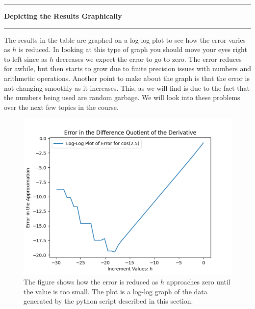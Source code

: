 \documentclass[10pt,fleqn]{article}
\begin{document}
\vskip0.1in\hrule\vskip0.1in \noindent
{\bf Depicting the Results Graphically}
\vskip0.1in\hrule\vskip0.1in \noindent
The results in the table are graphed on a log-log plot to see how the error
varies as \(h\) is reduced. In looking at this type of graph you should move
your eyes right to left since as \(h\) decreases we expect the error to go to
zero. The error reduces for awhile, but then starts to grow due to finite
precision issues with numbers and arithmetic operations. Another point to make
about the graph is that the error is not changing smoothly as it increases.
This, as we will find is due to the fact that the numbers being used are random
garbage. We will look into these problems over the next few topics in the
course.
\vfill
\begin{figure}[h]
\centering
\includegraphics{../images/diff_quotient_01.png}
\vskip0.1in
\caption{The figure shows how the error is reduced as \(h\) approaches zero
until the value is too small. The plot is a log-log graph of the data generated
by the python script described in this section.}
\end{figure}
\eject
\end{document}
